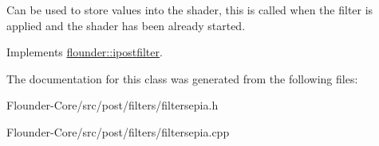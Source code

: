 Can be used to store values into the shader, this is called when the filter is applied and the shader has been already started. 



Implements \hyperlink{classflounder_1_1ipostfilter_a9b658b4672718d5ac36539875bde722e}{flounder\+::ipostfilter}.



The documentation for this class was generated from the following files\+:\begin{DoxyCompactItemize}
\item 
Flounder-\/\+Core/src/post/filters/filtersepia.\+h\item 
Flounder-\/\+Core/src/post/filters/filtersepia.\+cpp\end{DoxyCompactItemize}
